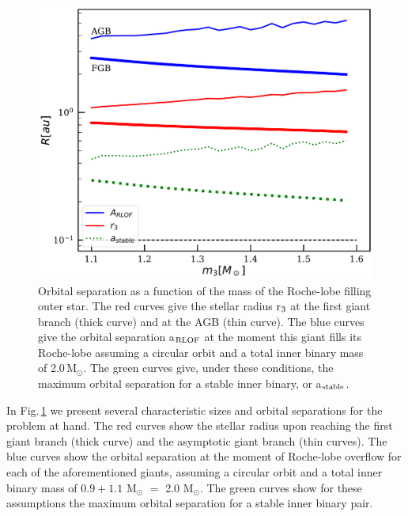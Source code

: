 \documentclass{aastex62}
\newcommand{\MSun}{\mbox{M$_\odot$}}
\begin{document}
\begin{figure}[ht!]
  \includegraphics[width=\columnwidth]{fig_minimumstablesize.pdf}
\caption{Orbital separation as a function of the mass of the
  Roche-lobe filling outer star. The red curves give the stellar radius r$_{\rm 3}$ at the
  first giant branch (thick curve) and at the AGB (thin curve). The
  blue curves give the orbital separation a$_{\rm RLOF}$ at the moment this giant fills its
  Roche-lobe assuming a circular orbit and a total inner binary mass
  of 2.0\,\MSun. The green curves give, under these conditions, the
  maximum orbital separation for a stable inner binary, or a$_{\rm stable}$.
\label{fig:tertiarymass_vs_size}}
\end{figure}

In Fig.\,\ref{fig:tertiarymass_vs_size} we present several characteristic sizes and orbital separations for the problem at hand.  
The red curves show the stellar radius upon reaching the first giant branch (thick curve) and the asymptotic 
giant branch (thin curves).  The blue curves show the orbital separation at the moment of Roche-lobe overflow for each of the aforementioned giants, 
assuming a circular orbit and a total inner binary mass of $0.9 + 1.1$ M$_{\odot}$ $=$ 2.0 M$_{\odot}$.  The green curves show 
for these assumptions the maximum orbital separation for a stable inner binary pair.    
\end{document}
